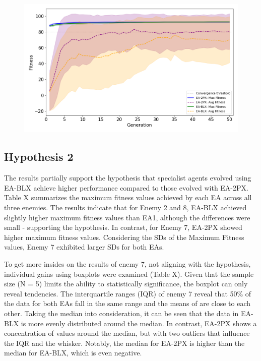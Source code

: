 \begin{figure}[htbp]
    \centering
    \includegraphics[width=\linewidth]{../../plots/enemy8}
    \caption{}
    \label{fig:enemy8}
\end{figure}

\subsection{Hypothesis 2}
The results partially support the hypothesis that specialist agents evolved using EA-BLX achieve higher performance compared to those evolved with EA-2PX.
Table X summarizes the maximum fitness values achieved by each EA across all three enemies.
The results indicate that for Enemy 2 and 8, EA-BLX achieved slightly higher maximum fitness values than EA1, although the differences were small - supporting the hypothesis.
In contrast, for Enemy 7, EA-2PX showed higher maximum fitness values.
Considering the SDs of the Maximum Fitness values, Enemy 7 exhibited larger SDs for both EAs.

To get more insides on the results of enemy 7, not aligning with the hypothesis, individual gains using boxplots were examined (Table X).
Given that the sample size (N = 5) limits the ability to statistically significance, the boxplot can only reveal tendencies.
The interquartile ranges (IQR) of enemy 7 reveal that 50\% of the data for both EAs fall in the same range and the means of are close to each other.
Taking the median into consideration, it can be seen that the data in EA-BLX is more evenly distributed around the median.
In contrast, EA-2PX shows a concentration of values around the median, but with two outliers that influence the IQR and the whisker.
Notably, the median for EA-2PX is higher than the median for EA-BLX, which is even negative.

